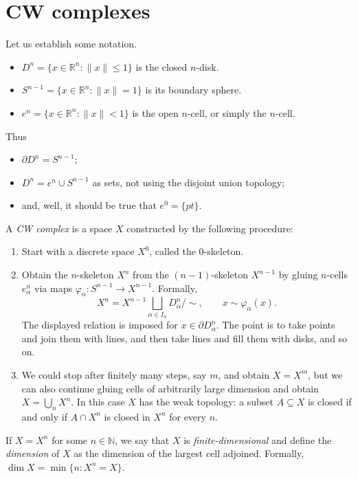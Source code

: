 \section{CW complexes}
\label{section-cw-complexes}

Let us establish some notation.
\begin{itemize}
\item $D^n=\{x\in\mathbb{R}^n:
\lVert x\rVert\leq1\}$ is the closed
$n$-disk.
\item $S^{n-1}=\{x\in\mathbb{R}^n:
\lVert x\rVert=1\}$ is its boundary sphere.
\item $e^n=\{x\in\mathbb{R}^n:
\lVert x\rVert<1\}$ is the open $n$-cell,
or simply the $n$-cell.
\end{itemize}
Thus
\begin{itemize}
\item $\partial D^n=S^{n-1}$;
\item $D^n=e^n\cup S^{n-1}$ as sets, not
using the disjoint
union topology;
\item and, well, it should be true that
$e^0=\{pt\}$.
\end{itemize}

\begin{definition}
A \emph{CW complex} is a space $X$
constructed
by the following procedure:
\begin{enumerate}
\item Start with a discrete space $X^0$,
called the
0-skeleton.
\item Obtain the $n$-skeleton $X^n$ from the
$(n-1)$-skeleton
$X^{n-1}$ by gluing $n$-cells $e^n_\alpha$
via maps
$\varphi_\alpha:S^{n-1}\to X^{n-1}$.
Formally,
$$
X^n=X^{n-1}\bigsqcup_{\alpha\in I_n}
D^n_\alpha\Big/\sim,
\qquad
x\sim\varphi_\alpha(x).
$$
The displayed relation is imposed for
$x\in\partial D^n_\alpha$.
The point is to take points and join them
with
lines, and then take lines and fill them with
disks, and so on.
\item We could stop after finitely many
steps, say $m$, and
obtain $X=X^m$, but we can also continue
gluing cells of
arbitrarily large dimension and obtain
$X=\bigcup_nX^n$. In
this case $X$ has the weak topology: a subset
$A\subseteq X$ is closed if and only if
$A\cap X^n$ is closed in $X^n$ for every $n$.
\end{enumerate}
\end{definition}

\begin{definition}
If $X=X^n$ for some $n\in\mathbb{N}$, we say
that $X$ is \emph{finite-dimensional} and
define the \emph{dimension} of $X$ as the
dimension of the largest cell adjoined.
Formally,
$\dim X=\min\{n:X^n=X\}$.
\end{definition}

